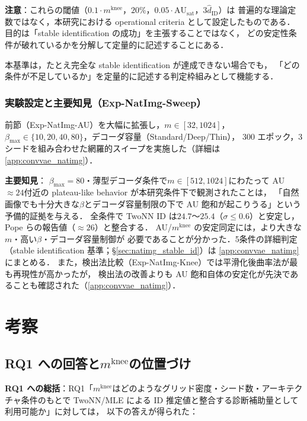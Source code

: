 \documentclass[11pt,a4paper]{jsarticle}
\newcommand{\AUsat}{\mathrm{AU}_{\mathrm{sat}}}
\newcommand{\mknee}{m^{\mathrm{knee}}}
\begin{document}
\textbf{注意}：これらの閾値（$0.1\cdot\mknee$，$20\%$，$0.05\cdot\AUsat$，$3\hat{d}_\mathrm{ID}$）は
普遍的な理論定数ではなく，本研究における operational criteria として設定したものである．
目的は「stable identification の成功」を主張することではなく，
どの安定性条件が破れているかを分解して定量的に記述することにある．

本基準は，たとえ完全な stable identification が達成できない場合でも，
「どの条件が不足しているか」を定量的に記述する判定枠組みとして機能する．

\subsubsection*{実験設定と主要知見（Exp-NatImg-Sweep）}

前節（Exp-NatImg-AU）を大幅に拡張し，$m \in [32, 1024]$，
$\beta_{\max} \in \{10,20,40,80\}$，デコーダ容量（Standard/Deep/Thin），
300 エポック，3シードを組み合わせた網羅的スイープを実施した（詳細は\ref{app:convvae_natimg}）．

\textbf{主要知見}：
$\beta_{\max}=80$・薄型デコーダ条件で$m \in [512, 1024]$にわたって AU$\approx 24$付近の
plateau-like behavior が本研究条件下で観測されたことは，
「自然画像でも十分大きな$\beta$とデコーダ容量制限の下で AU 飽和が起こりうる」という
予備的証拠を与える．
全条件で TwoNN ID は$24.7$〜$25.4$（$\sigma \leq 0.6$）と安定し，
Pope ら\cite{pope2021intrinsic}の報告値（$\approx 26$）と整合する．
AU/$\mknee$ の安定同定には，より大きな$m$・高い$\beta$・デコーダ容量制御が
必要であることが分かった．5条件の詳細判定（stable identification 基準；§\ref{sec:natimg_stable_id}）は
\ref{app:convvae_natimg}にまとめる．
また，検出法比較（Exp-NatImg-Knee）では平滑化後曲率法が最も再現性が高かったが，
検出法の改善よりも AU 飽和自体の安定化が先決であることも確認された（\ref{app:convvae_natimg}）．

\section{考察}\label{sec:discussion}

\subsection{RQ1 への回答と$\mknee$の位置づけ}\label{sec:disc_mknee}

\textbf{RQ1 への総括}：RQ1「$\mknee$はどのようなグリッド密度・シード数・アーキテクチャ条件のもとで
TwoNN/MLE による ID 推定値と整合する診断補助量として利用可能か」に対しては，
以下の答えが得られた：
\end{document}
